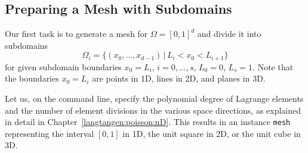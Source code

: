 


\subsection{Preparing a Mesh with Subdomains}
\label{langtangen:possion:nD:nmat:prepro}

Our first task is to generate a mesh for $\Omega = [0,1]^d$ and divide
it into subdomains
\[ \Omega_i = \{ (x_0,\ldots,x_{d-1})\, |\, L_i<x_0<L_{i+1}\}\]
for given subdomain boundaries $x_0=L_i$, $i=0,\ldots,s$, $L_0=0$, $L_s=1$.
Note that the boundaries $x_0=L_i$ are points in 1D, lines in 2D, and
planes in 3D.

Let us, on the command line, specify the polynomial degree of Lagrange
elements and the number of element divisions in the various space
directions, as explained in detail in
Chapter~\ref{langtangen:poisson:nD}. This results in an instance {\fontsize{12pt}{12pt}\texttt{mesh}}
representing the interval $[0,1]$ in 1D, the unit square in 2D, or the
unit cube in 3D.

